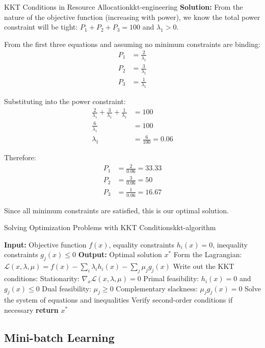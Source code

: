 \documentclass[12pt]{article}
\begin{document}
\begin{example}{KKT Conditions in Resource Allocation}{kkt-engineering}
\textbf{Solution:} From the nature of the objective function (increasing with power), we know the total power constraint will be tight: $P_1 + P_2 + P_3 = 100$ and $\lambda_1 > 0$.

From the first three equations and assuming no minimum constraints are binding:
\begin{align}
P_1 &= \frac{2}{\lambda_1} \\
P_2 &= \frac{3}{\lambda_1} \\
P_3 &= \frac{1}{\lambda_1}
\end{align}

Substituting into the power constraint:
\begin{align}
\frac{2}{\lambda_1} + \frac{3}{\lambda_1} + \frac{1}{\lambda_1} &= 100 \\
\frac{6}{\lambda_1} &= 100 \\
\lambda_1 &= \frac{6}{100} = 0.06
\end{align}

Therefore:
\begin{align}
P_1 &= \frac{2}{0.06} = 33.33 \\
P_2 &= \frac{3}{0.06} = 50 \\
P_3 &= \frac{1}{0.06} = 16.67
\end{align}

Since all minimum constraints are satisfied, this is our optimal solution.
\end{example}

\begin{algorithmenv}{Solving Optimization Problems with KKT Conditions}{kkt-algorithm}
\begin{algorithmic}[1]
\State \textbf{Input:} Objective function $f(x)$, equality constraints $h_i(x) = 0$, inequality constraints $g_j(x) \leq 0$
\State \textbf{Output:} Optimal solution $x^*$
\State Form the Lagrangian: $\mathcal{L}(x, \lambda, \mu) = f(x) - \sum_i \lambda_i h_i(x) - \sum_j \mu_j g_j(x)$
\State Write out the KKT conditions:
\State \quad Stationarity: $\nabla_x \mathcal{L}(x, \lambda, \mu) = 0$
\State \quad Primal feasibility: $h_i(x) = 0$ and $g_j(x) \leq 0$
\State \quad Dual feasibility: $\mu_j \geq 0$
\State \quad Complementary slackness: $\mu_j g_j(x) = 0$
\State Solve the system of equations and inequalities
\State Verify second-order conditions if necessary
\State \textbf{return} $x^*$
\end{algorithmic}
\end{algorithmenv}

\subsection{Mini-batch Learning}
\end{document}
